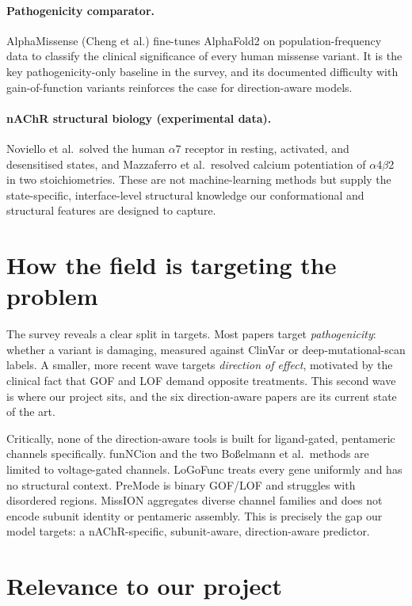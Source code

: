 \documentclass[11pt]{article}
\begin{document}
\paragraph{Pathogenicity comparator.}
AlphaMissense (Cheng et al.) fine-tunes AlphaFold2 on population-frequency data
to classify the clinical significance of every human missense variant. It is the
key pathogenicity-only baseline in the survey, and its documented difficulty
with gain-of-function variants reinforces the case for direction-aware models.

\paragraph{nAChR structural biology (experimental data).}
Noviello et al.\ solved the human $\alpha$7 receptor in resting, activated, and
desensitised states, and Mazzaferro et al.\ resolved calcium potentiation of
$\alpha$4$\beta$2 in two stoichiometries. These are not machine-learning methods
but supply the state-specific, interface-level structural knowledge our
conformational and structural features are designed to capture.

\section{How the field is targeting the problem}

The survey reveals a clear split in targets. Most papers target
\emph{pathogenicity}: whether a variant is damaging, measured against ClinVar or
deep-mutational-scan labels. A smaller, more recent wave targets
\emph{direction of effect}, motivated by the clinical fact that GOF and LOF
demand opposite treatments. This second wave is where our project sits, and the
six direction-aware papers are its current state of the art.

Critically, none of the direction-aware tools is built for ligand-gated,
pentameric channels specifically. funNCion and the two Bo{\ss}elmann et al.\
methods are limited to voltage-gated channels. LoGoFunc treats every gene
uniformly and has no structural context. PreMode is binary GOF/LOF and
struggles with disordered regions. MissION aggregates diverse channel families
and does not encode subunit identity or pentameric assembly. This is precisely
the gap our model targets: a nAChR-specific, subunit-aware, direction-aware
predictor.

\section{Relevance to our project}
\end{document}

